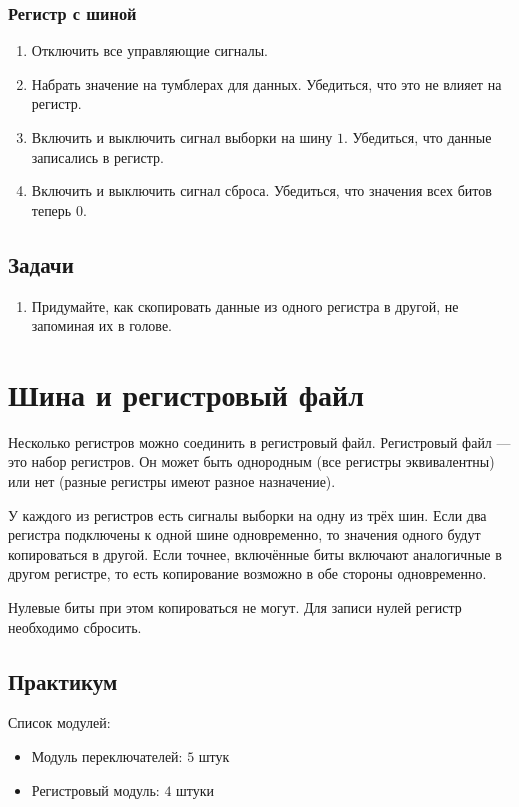 \subsubsection{Регистр с шиной}

\begin{enumerate}
    \item Отключить все управляющие сигналы.
    \item Набрать значение на тумблерах для данных. Убедиться, что это не влияет на регистр.
    \item Включить и выключить сигнал выборки на шину $1$. Убедиться, что данные записались в регистр.
    \item Включить и выключить сигнал сброса. Убедиться, что значения всех битов теперь $0$.
\end{enumerate}

\subsection{Задачи}

\begin{enumerate}
    \item Придумайте, как скопировать данные из одного регистра в другой, не запоминая их в голове.
\end{enumerate}


\section{Шина и регистровый файл}

Несколько регистров можно соединить в регистровый файл.
Регистровый файл --- это набор регистров. Он может быть однородным
(все регистры эквивалентны) или нет (разные регистры имеют разное назначение).

У каждого из регистров есть сигналы выборки на одну из трёх шин.
Если два регистра подключены к одной шине одновременно,
то значения одного будут копироваться в другой. Если точнее,
включённые биты включают аналогичные в другом регистре, то есть
копирование возможно в обе стороны одновременно.

Нулевые биты при этом копироваться не могут. Для записи нулей
регистр необходимо сбросить.


\subsection{Практикум}


Список модулей:
\begin{itemize}
    \item Модуль переключателей: $5$ штук
    \item Регистровый модуль: $4$ штуки
\end{itemize}

